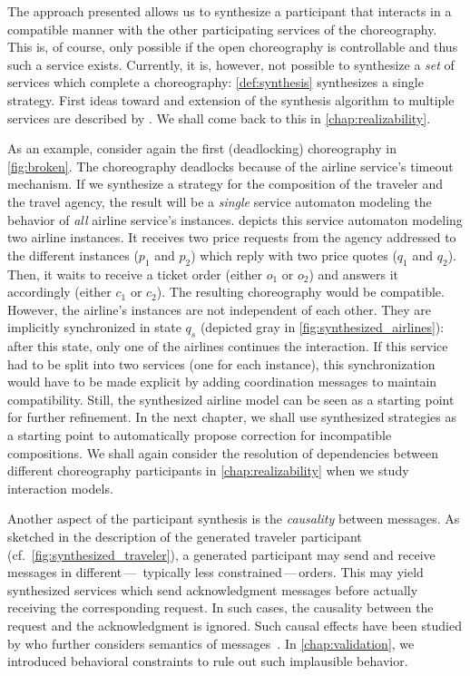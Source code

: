 The approach presented allows us to synthesize a participant that interacts in a compatible manner with the other participating services of the choreography. This is, of course, only possible if the open choreography is controllable and thus such a service exists. Currently, it is, however, not possible to synthesize a \emph{set} of services which complete a choreography: \autoref{def:synthesis} synthesizes a single strategy. First ideas toward and extension of the synthesis algorithm to multiple services are described by \citet{Wolf_2008_topnoc}. We shall come back to this in \autoref{chap:realizability}.

As an example, consider again the first (deadlocking) choreography in \autoref{fig:broken}. The choreography deadlocks because of the airline service's timeout mechanism. If we synthesize a strategy for the composition of the traveler and the travel agency, the result will be a \emph{single} service automaton modeling the behavior of \emph{all} airline service's instances.  depicts this service automaton modeling two airline instances. It receives two price requests from the agency addressed to the different instances ($p_{1}$ and $p_{2}$) which reply with two price quotes ($q_{1}$ and $q_{2}$). Then, it waits to receive a ticket order (either $o_{1}$ or $o_{2}$) and answers it accordingly (either $c_{1}$ or $c_{2}$). The resulting choreography would be compatible. However, the airline's instances are not independent of each other. They are implicitly synchronized in state $q_{s}$ (depicted gray in \autoref{fig:synthesized_airlines}): after this state, only one of the airlines continues the interaction. If this service had to be split into two services (one for each instance), this synchronization would have to be made  explicit by adding coordination messages to maintain compatibility. Still, the synthesized airline model can be seen as a starting point for further refinement. In the next chapter, we shall use synthesized strategies as a starting point to automatically propose correction for incompatible compositions. We shall again consider the resolution of dependencies between different choreography participants in \autoref{chap:realizability} when we study interaction models.

\medskip

\enlargethispage*{\baselineskip}

Another aspect of the participant synthesis is the \emph{causality} between messages. As sketched in the description of the generated traveler participant (cf.~\autoref{fig:synthesized_traveler}), a generated participant may send and receive messages in different\,--- \,typically less constrained\,---\,orders. This may yield synthesized services which send acknowledgment messages before actually receiving the corresponding request. In such cases, the causality between the request and the acknowledgment is ignored. Such causal effects have been studied by \citet{Wolf_2008_topnoc} who further considers semantics of messages~\cite{Wolf_2008_awpn}. In \autoref{chap:validation}, we introduced behavioral constraints to rule out such implausible behavior.





